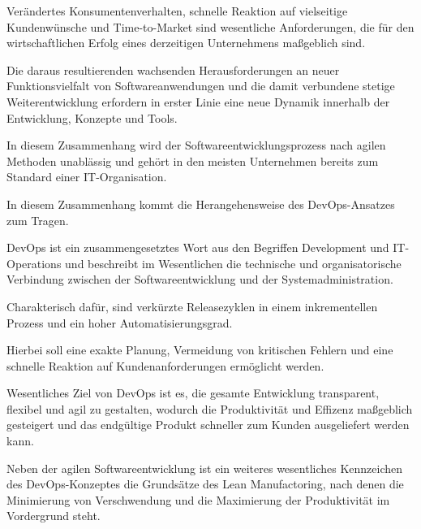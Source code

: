 
Verändertes Konsumentenverhalten, schnelle Reaktion auf vielseitige Kundenwünsche und Time-to-Market sind wesentliche Anforderungen, die für den wirtschaftlichen Erfolg eines derzeitigen Unternehmens maßgeblich sind.

Die daraus resultierenden wachsenden Herausforderungen an neuer Funktionsvielfalt von Softwareanwendungen und die damit verbundene stetige Weiterentwicklung erfordern in erster Linie eine neue Dynamik innerhalb der Entwicklung, Konzepte und Tools. 

In diesem Zusammenhang wird der Softwareentwicklungsprozess nach agilen Methoden unablässig und gehört in den meisten Unternehmen bereits zum Standard einer IT-Organisation. 

In diesem Zusammenhang kommt die Herangehensweise des DevOps-Ansatzes zum Tragen.

DevOps ist ein zusammengesetztes Wort aus den Begriffen Development und IT-Operations und beschreibt im Wesentlichen die technische und organisatorische Verbindung zwischen der Softwareentwicklung und der Systemadministration.\cite[S.23]{alt_innovationsorientiertes_2017}

Charakterisch dafür, sind verkürzte Releasezyklen in einem inkrementellen Prozess und ein hoher Automatisierungsgrad. 

Hierbei soll eine exakte Planung, Vermeidung von kritischen Fehlern und eine schnelle Reaktion auf Kundenanforderungen ermöglicht werden. 

Wesentliches Ziel von DevOps ist es, die gesamte Entwicklung transparent, flexibel und agil zu gestalten, wodurch die Produktivität und Effizenz maßgeblich gesteigert und das endgültige Produkt schneller zum Kunden ausgeliefert werden kann.\cite{hemon_agile_2020}  

Neben der agilen Softwareentwicklung ist ein weiteres wesentliches Kennzeichen des DevOps-Konzeptes die Grundsätze des Lean Manufactoring, nach denen die Minimierung von Verschwendung und die Maximierung der Produktivität im Vordergrund steht.\cite{samulat_raus_2017} 

